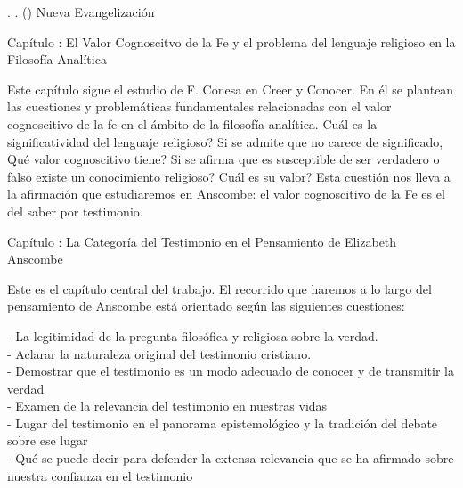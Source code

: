 \documentclass[11pt]{article}
\begin{document}
{\begin{spacing}{1.5}
\tab \tab \tab \tab {}. 
. 
()
Nueva Evangelización

\tab \tab {}

\tab \tab {}

{\LARGE Capítulo : 
El Valor Cognoscitvo de la Fe y el problema del lenguaje religioso en la Filosofía Analítica}

\begin{spacing}{1}
Este capítulo sigue el estudio de F. Conesa en Creer y Conocer. En él se plantean las cuestiones y problemáticas fundamentales relacionadas con el valor cognoscitivo de la fe en el ámbito de la filosofía analítica.  \textquestiondown{}Cuál es la significatividad del lenguaje religioso? Si se admite que no carece de significado, \textquestiondown{}Qué valor cognoscitivo tiene? Si se afirma que es susceptible de ser verdadero o falso \textquestiondown{}existe un conocimiento religioso? \textquestiondown{}Cuál es su valor? Esta cuestión nos lleva a la afirmación que estudiaremos en Anscombe: el valor cognoscitivo de la Fe es el del saber por testimonio.
\end{spacing}

\tab{}

\tab{}

\tab{}

\tab{}

{\LARGE Capítulo : 
La Categoría del Testimonio en el Pensamiento de Elizabeth Anscombe}
\begin{spacing}{1}
Este es el capítulo central del trabajo. El recorrido que haremos a lo largo del pensamiento de Anscombe está orientado según las siguientes cuestiones:

\noindent- La legitimidad de la pregunta filosófica y religiosa sobre la verdad.\\
- Aclarar la naturaleza original del testimonio cristiano.\\
- Demostrar que el testimonio es un modo adecuado de conocer y de transmitir la verdad\\
- Examen de la relevancia del testimonio en nuestras vidas\\
- Lugar del testimonio en el panorama epistemológico y la tradición del debate sobre ese lugar\\
- Qué se puede decir para defender la extensa relevancia que se ha afirmado sobre nuestra confianza en el testimonio


\end{spacing}
\end{spacing}}
\end{document}
